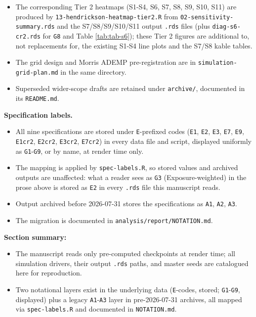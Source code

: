 \documentclass[
  11pt,
]{article}
\providecommand{\tightlist}{%
  \setlength{\itemsep}{0pt}\setlength{\parskip}{0pt}}
\begin{document}
\begin{itemize}
  document.
\item
  The corresponding Tier 2 heatmaps (S1-S4, S6, S7, S8, S9, S10, S11)
  are produced by \texttt{13-hendrickson-heatmap-tier2.R} from
  \texttt{02-sensitivity-summary.rds} and the S7/S8/S9/S10/S11 output \texttt{.rds}
  files (plus \texttt{diag-s6-cr2.rds} for \texttt{G8} and Table
  \ref{tab:tab-s6}); these Tier 2 figures are additional to, not
  replacements for, the existing S1-S4 line plots and the S7/S8
  kable tables.
\item
  The grid design and Morris ADEMP pre-registration are in
  \texttt{simulation-grid-plan.md} in the same directory.
\item
  Superseded wider-scope drafts are retained under \texttt{archive/},
  documented in its \texttt{README.md}.
\end{itemize}

\textbf{Specification labels.}

\begin{itemize}
\tightlist
\item
  All nine specifications are stored under \texttt{E}-prefixed codes (\texttt{E1},
  \texttt{E2}, \texttt{E3}, \texttt{E7}, \texttt{E9}, \texttt{E1cr2}, \texttt{E2cr2}, \texttt{E3cr2}, \texttt{E7cr2}) in every
  data file and script, displayed uniformly as \texttt{G1}-\texttt{G9}, or by name,
  at render time only.
\item
  The mapping is applied by \texttt{spec-labels.R}, so stored values and
  archived outputs are unaffected: what a reader sees as \texttt{G3}
  (Exposure-weighted) in the prose above is stored as \texttt{E2} in every
  \texttt{.rds} file this manuscript reads.
\item
  Output archived before 2026-07-31 stores the specifications as
  \texttt{A1}, \texttt{A2}, \texttt{A3}.
\item
  The migration is documented in \texttt{analysis/report/NOTATION.md}.
\end{itemize}

\textbf{Section summary:}

\begin{itemize}
\tightlist
\item
  The manuscript reads only pre-computed checkpoints at render time;
  all simulation drivers, their output \texttt{.rds} paths, and master seeds
  are catalogued here for reproduction.
\item
  Two notational layers exist in the underlying data (\texttt{E}-codes,
  stored; \texttt{G1}-\texttt{G9}, displayed) plus a legacy \texttt{A1}-\texttt{A3} layer in
  pre-2026-07-31 archives, all mapped via \texttt{spec-labels.R} and
  documented in \texttt{NOTATION.md}.
\end{itemize}
\end{document}
